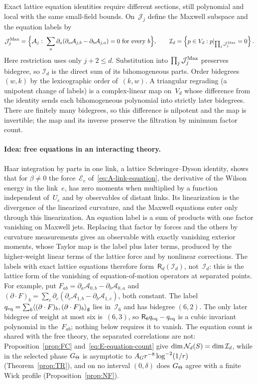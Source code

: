 Exact lattice equation identities require different sections, still polynomial and local with the same small-field bounds. On~$\mathcal J_j$ define the Maxwell subspace and the equation labels by
\begin{equation*}
\mathcal J_j^{\rm Max}=\Bigl\{\mathcal A_j:\ \sum_a\partial_a(\partial_a\mathcal A_{j,b}-\partial_b\mathcal A_{j,a})=0\ \text{for every }b\Bigr\},\qquad
\mathcal I_d=\Bigl\{p\in V_d:p|_{\prod_j\mathcal J_j^{\rm Max}}=0\Bigr\}\,.
\end{equation*}
Here restriction uses only $j+2\le d$. Substitution into $\prod_j\mathcal J_j^{\rm Max}$ preserves bidegree, so $\mathcal I_d$ is the direct sum of its bihomogeneous parts. Order bidegrees~$(w,k)$ by the lexicographic order of~$(k,w)$. A triangular regrading (a unipotent change of labels) is a complex-linear map on~$V_d$ whose difference from the identity sends each bihomogeneous polynomial into strictly later bidegrees. There are finitely many bidegrees, so this difference is nilpotent and the map is invertible; the map and its inverse preserve the filtration by minimum factor count.

\paragraph{Idea: free equations in an interacting theory.} Haar integration by parts in one link, a lattice Schwinger--Dyson identity, shows that for $\beta\ne0$ the force~$\mathcal E_e$ of~\eqref{eq:A-link-equation}, the derivative of the Wilson energy in the link~$e$, has zero moments when multiplied by a function independent of~$U_e$ and by observables of distant links. Its linearization is the divergence of the linearized curvature, and the Maxwell equations enter only through this linearization. An equation label is a sum of products with one factor vanishing on Maxwell jets. Replacing that factor by forces and the others by curvature measurements gives an observable with exactly vanishing exterior moments, whose Taylor map is the label plus later terms, produced by the higher-weight linear terms of the lattice force and by nonlinear corrections. The labels with exact lattice equations therefore form~$\mathsf R_d(\mathcal I_d)$, not~$\mathcal I_d$: this is the lattice form of the vanishing of equation-of-motion operators at separated points. For example, put $F_{ab}=\partial_a\mathcal A_{0,b}-\partial_b\mathcal A_{0,a}$ and $(\partial\cdot F)_b=\sum_c\partial_c(\partial_c\mathcal A_{1,b}-\partial_b\mathcal A_{1,c})$, both constant. The label $q_{\rm eq}=\sum_b\langle(\partial\cdot F)_b,(\partial\cdot F)_b\rangle_{\mathfrak{g}}$ lies in~$\mathcal I_6$ and has bidegree $(6,2)$. The only later bidegree of weight at most six is~$(6,3)$, so $\mathsf R_6q_{\rm eq}-q_{\rm eq}$ is a cubic invariant polynomial in the~$F_{ab}$; nothing below requires it to vanish. The equation count is shared with the free theory, the separated correlations are not: Proposition~\ref{prop:FC} and~\eqref{eq:E-equation-count} give $\dim\mathcal{N}_{d}(S)=\dim\mathcal I_d$, while in the selected phase $G_{\Theta}$ is asymptotic to $A_G r^{-8}\log^{-2}(1/r)$ (Theorem~\ref{prop:TR}), and on no interval $(0,\delta)$ does $G_{\Theta}$ agree with a finite Wick profile (Proposition~\ref{prop:NF}).

